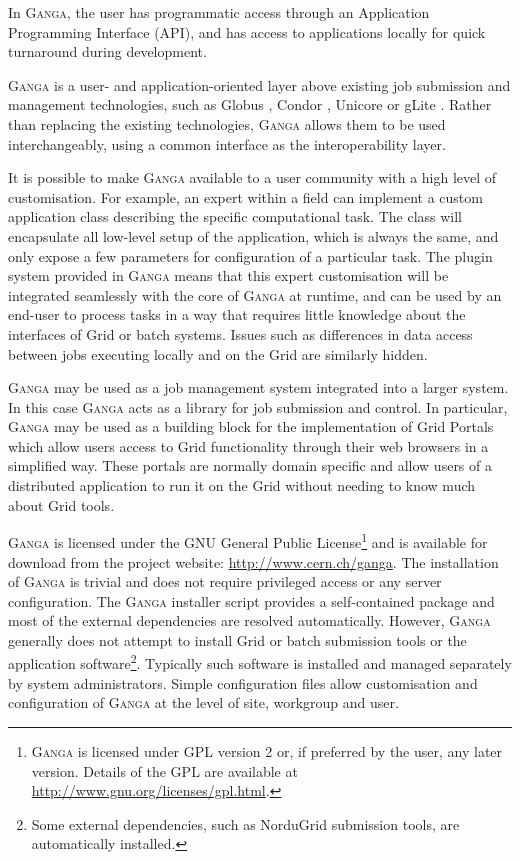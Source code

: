 \documentclass{elsart}
\def\ganga {\textsc{Ganga}\xspace}
\def\grid {Grid\xspace}
\newcommand{\qq}[1]{#1}
\begin{document}
\begin{linenumbers}
In \ganga, the user has programmatic access through an Application
Programming Interface (API), and has access to applications locally for
quick turnaround during development. 

\qq{ \ganga is a user- and application-oriented layer above 
existing job submission and management technologies, such as
Globus \cite{Globus}, Condor \cite{Condor}, Unicore \cite{Unicore} or
gLite \cite{andreetto_2008}. Rather than replacing the existing
technologies, \ganga allows them to be used interchangeably, using a
common interface as the interoperability layer. }


It is possible to make \ganga available to a user community with a high level
of customisation. For example, an expert within a field can implement a custom
application class describing the specific computational task. The class will
encapsulate all low-level setup of the application, which is always
the same, and only expose a few parameters for configuration of a particular
task. The plugin system provided in \ganga means that this expert
customisation will be integrated seamlessly with the core of \ganga at runtime,
and can be used by an end-user to process tasks in a way that requires
little knowledge about the interfaces of \grid or batch systems. Issues such as
differences in data access between jobs executing locally and on the
\grid are similarly hidden.

\ganga may be used as a job management system integrated into a larger system. In this
case \ganga acts as a library for job submission and control. In particular,
\ganga may be used as a building block for the implementation of \grid Portals
which allow users access to \grid functionality through
their web browsers in a simplified way. These portals are normally
domain specific and allow users of a distributed application to run it
on the \grid without needing to know much about \grid tools. 


\ganga is licensed under the GNU General Public
License\footnote{\ganga is licensed under GPL version 2 or, if preferred by
the user, any later version.  Details of the GPL are available at
\url{http://www.gnu.org/licenses/gpl.html}.} and is available for download from
the project website: \url{http://www.cern.ch/ganga}. The installation
of \ganga is trivial and does not require privileged access or any
server configuration. \qq{The \ganga installer script provides a
self-contained package and most of the external dependencies are resolved
automatically. However, \ganga generally does not attempt to
install \grid or batch submission tools or the application
software\footnote{Some external dependencies, such as NorduGrid submission tools, are automatically installed.}. Typically such software is installed and managed separately
by system administrators.  Simple configuration files allow 
customisation and configuration of \ganga at the level of site, workgroup and user.
}


\end{linenumbers}
\end{document}
